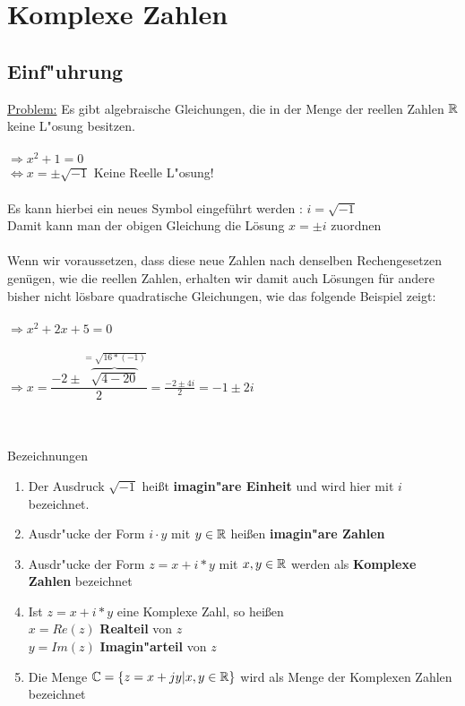 \chapter{Komplexe Zahlen}



	\section{Einf"uhrung}
\underline{Problem:} Es gibt algebraische Gleichungen, die in der Menge  der reellen Zahlen $\mathbb{R}$  keine L"osung besitzen.\\
\\
$\Rightarrow x^2 + 1 = 0   $\\
$\Leftrightarrow x = ± \sqrt{-1}$ Keine Reelle L"osung!\\
\\
Es kann hierbei ein neues Symbol eingeführt werden : $i = \sqrt{-1} $\\
Damit kann man der obigen Gleichung die Lösung $x =±i$ zuordnen\\
\\
Wenn wir voraussetzen, dass diese neue Zahlen nach denselben Rechengesetzen genügen, wie die reellen Zahlen, erhalten wir damit auch Lösungen für andere bisher nicht lösbare quadratische Gleichungen, wie das folgende Beispiel zeigt:\\
\\
$\Rightarrow x^2 + 2x + 5 = 0$\\
\\
$\Rightarrow x = \dfrac { -2± \overbrace{ \sqrt{4-20}}^{=\sqrt{16*(-1)}} } { 2}
=\frac {-2 ±4i}{2}
= -1±2i$\\
\\
\\
\begin{Bemerkung}
Bezeichnungen\\
\end{Bemerkung}

\begin{enumerate}
\item Der Ausdruck $\sqrt{-1}$ heißt \textbf{imagin"are Einheit} und wird hier mit $i$ bezeichnet.
\item Ausdr"ucke der Form $i\cdot y$ mit $y \in \mathbb{R}$  heißen \textbf{imagin"are Zahlen}
\item Ausdr"ucke der Form $z =x+i*y$ mit $x,y \in \mathbb{R}$ werden als \textbf{Komplexe Zahlen} bezeichnet
\item Ist $z =x+i*y$ eine Komplexe Zahl, so heißen\\
\indent $x=Re(z)$ \textbf{Realteil} von $z$\\
\indent $y=Im(z)$ \textbf{Imagin"arteil} von $z$
\item Die Menge $\mathbb{C} =\{ {z = x+j y| x, y \in \mathbb{R}}\}$ wird als Menge der Komplexen Zahlen bezeichnet\\
\end{enumerate}

